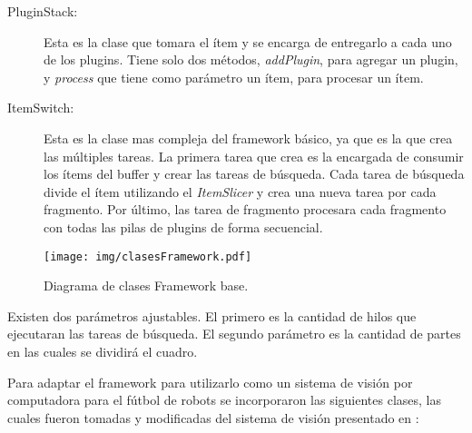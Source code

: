 \begin{description}
\item[PluginStack:] Esta es la clase que tomara el ítem y se encarga de
	entregarlo a cada uno de los plugins. Tiene solo dos métodos,
	\emph{addPlugin}, para agregar un plugin, y \emph{process} que tiene
	como parámetro un ítem, para procesar un ítem.

\item[ItemSwitch:] Esta es la clase mas compleja del framework básico, ya que es
	la que crea las múltiples tareas. La primera tarea que crea es la
	encargada de consumir los ítems del buffer y crear las tareas de
	búsqueda. Cada tarea de búsqueda divide el ítem utilizando el
	\emph{ItemSlicer} y crea una nueva tarea por cada fragmento. Por último,
	las tarea de fragmento procesara cada fragmento con todas las pilas de
	plugins de forma secuencial.

\end{description}

\begin{figure}[h]

	\texttt{[image: img/clasesFramework.pdf]}

	\caption{Diagrama de clases Framework base.}

\end{figure}

Existen dos parámetros ajustables. El primero es la cantidad de hilos que
ejecutaran las tareas de búsqueda. El segundo parámetro es la cantidad de partes
en las cuales se dividirá el cuadro.

Para adaptar el framework para utilizarlo como un sistema de visión por
computadora para el fútbol de robots se incorporaron las siguientes clases, las
cuales fueron tomadas y modificadas del sistema de visión presentado en
\cite{torres2014}:

